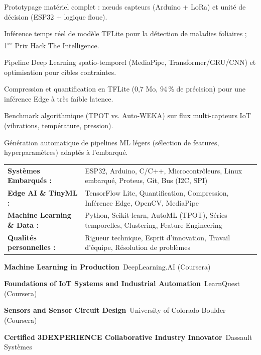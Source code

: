 \documentclass[10pt,a4paper]{../altacv}
\begin{document}
\begin{cvitems}
  \item Prototypage matériel complet : nœuds capteurs (Arduino + LoRa) et unité de décision (ESP32 + logique floue).
  \item Inférence temps réel de modèle TFLite pour la détection de maladies foliaires ; 1\textsuperscript{er} Prix Hack The Intelligence.
\end{cvitems}
\vspace{2pt}
\begin{cvitems}
  \item Pipeline Deep Learning spatio-temporel (MediaPipe, Transformer/GRU/CNN) et optimisation pour cibles contraintes.
  \item Compression et quantification en TFLite (0,7 Mo, 94\,\% de précision) pour une inférence Edge à très faible latence.
\end{cvitems}
\vspace{2pt}
\begin{cvitems}
  \item Benchmark algorithmique (TPOT vs. Auto-WEKA) sur flux multi-capteurs IoT (vibrations, température, pression).
  \item Génération automatique de pipelines ML légers (sélection de features, hyperparamètres) adaptés à l’embarqué.
\end{cvitems}

{\small
\begin{tabular}{@{}ll@{}}
\textbf{Systèmes Embarqués :} & ESP32, Arduino, C/C++, Microcontrôleurs, Linux embarqué, Proteus, Git, Bus (I2C, SPI) \\[1.5pt]
\textbf{Edge AI \& TinyML :} & TensorFlow Lite, Quantification, Compression, Inférence Edge, OpenCV, MediaPipe \\[1.5pt]
\textbf{Machine Learning \& Data :} & Python, Scikit-learn, AutoML (TPOT), Séries temporelles, Clustering, Feature Engineering \\[1.5pt]
\textbf{Qualités personnelles :} & Rigueur technique, Esprit d'innovation, Travail d’équipe, Résolution de problèmes
\end{tabular}
}

\begin{cvitems}
  \item \textbf{Machine Learning in Production}~\hfill {\color{emphasis}DeepLearning.AI (Coursera)}
  \item \textbf{Foundations of IoT Systems and Industrial Automation}~\hfill {\color{emphasis}LearnQuest (Coursera)}
  \item \textbf{Sensors and Sensor Circuit Design}~\hfill {\color{emphasis}University of Colorado Boulder (Coursera)}
  \item \textbf{Certified 3DEXPERIENCE Collaborative Industry Innovator}~\hfill {\color{emphasis}Dassault Systèmes}
\end{cvitems}

\cvactivites
\cvlangues
\end{document}
